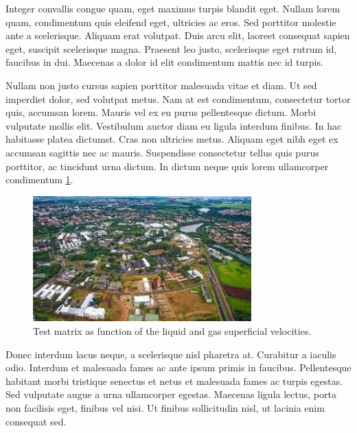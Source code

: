  Integer convallis congue quam, eget maximus turpis blandit eget. Nullam lorem quam, condimentum quis eleifend eget, ultricies ac eros. Sed porttitor molestie ante a scelerisque. Aliquam erat volutpat. Duis arcu elit, laoreet consequat sapien eget, suscipit scelerisque magna. Praesent leo justo, scelerisque eget rutrum id, faucibus in dui. Maecenas a dolor id elit condimentum mattis nec id turpis.

  Nullam non justo cursus sapien porttitor malesuada vitae et diam. Ut sed imperdiet dolor, sed volutpat metus. Nam at est condimentum, consectetur tortor quis, accumsan lorem. Mauris vel ex eu purus pellentesque dictum. Morbi vulputate mollis elit. Vestibulum auctor diam eu ligula interdum finibus. In hac habitasse platea dictumst. Cras non ultricies metus. Aliquam eget nibh eget ex accumsan sagittis nec ac mauris. Suspendisse consectetur tellus quis purus porttitor, ac tincidunt urna dictum. In dictum neque quis lorem ullamcorper condimentum \ref{fig:tst_mtx}.

  \begin{figure}[!htb]
      \centering
      \includegraphics[width=0.75\textwidth, keepaspectratio]{unicamp.jpg}
      \caption[Test matrix.]{ Test matrix as function of the liquid and gas superficial velocities.}
      \label{fig:tst_mtx}
  \end{figure}

  Donec interdum lacus neque, a scelerisque nisl pharetra at. Curabitur a iaculis odio. Interdum et malesuada fames ac ante ipsum primis in faucibus. Pellentesque habitant morbi tristique senectus et netus et malesuada fames ac turpis egestas. Sed vulputate augue a urna ullamcorper egestas. Maecenas ligula lectus, porta non facilisis eget, finibus vel nisi. Ut finibus sollicitudin nisl, ut lacinia enim consequat sed.

